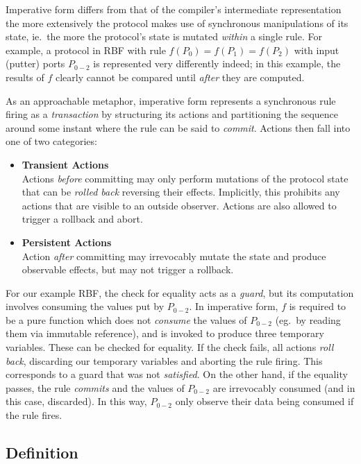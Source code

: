 Imperative form differs from that of the compiler's intermediate representation the more extensively the protocol makes use of synchronous manipulations of its state, ie.\ the more the protocol's state is mutated \textit{within} a single rule. For example, a protocol in RBF with rule $f(P_0)=f(P_1)=f(P_2)$ with input (putter) ports $P_{0-2}$ is represented very differently indeed; in this example, the results of $f$ clearly cannot be compared until \textit{after} they are computed.

As an approachable metaphor, imperative form represents a synchronous rule firing as a \textit{transaction} by structuring its actions and partitioning the sequence around some instant where the rule can be said to \textit{commit}. Actions then fall into one of two categories:
\begin{itemize}
	\item \textbf{Transient Actions}\\
	Actions \textit{before} committing may only perform mutations of the protocol state that can be \textit{rolled back} reversing their effects. Implicitly, this prohibits any actions that are visible to an outside observer. Actions are also allowed to trigger a rollback and abort.
	
	\item \textbf{Persistent Actions}\\
	Action \textit{after} committing may irrevocably mutate the state and produce observable effects, but may not trigger a rollback.
\end{itemize}

For our example RBF, the check for equality acts as a \textit{guard}, but its computation involves consuming the values put by $P_{0-2}$. In imperative form, $f$ is required to be a pure function which does not \textit{consume} the values of $P_{0-2}$ (eg.\ by reading them via immutable reference), and is invoked to produce three temporary variables. These can be checked for equality. If the check fails, all actions \textit{roll back}, discarding our temporary variables and aborting the rule firing. This corresponds to a guard that was not \textit{satisfied}. On the other hand, if the equality passes, the rule \textit{commits} and the values of $P_{0-2}$ are irrevocably consumed (and in this case, discarded). In this way, $P_{0-2}$ only observe their data being consumed if the rule fires.

\subsection{Definition}



